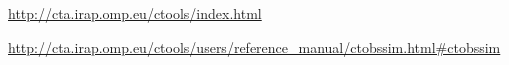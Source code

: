 \documentclass[a4paper,12pt,oneside]{book}
\begin{document}
\begin{onehalfspace}
	\begin{thebibliography}{99}
		
		 \url{http://cta.irap.omp.eu/ctools/index.html}
		
		 \url{http://cta.irap.omp.eu/ctools/users/reference_manual/ctobssim.html#ctobssim}
	
	\end{thebibliography}

\end{onehalfspace}
\end{document}
